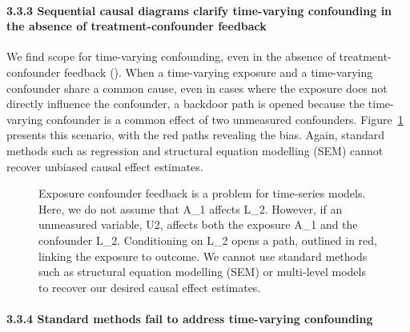 \documentclass[
  singlecolumn]{article}
\let\oldparagraph\paragraph
\renewcommand{\paragraph}[1]{\oldparagraph{#1}\mbox{}}
\begin{document}
\paragraph{3.3.3 Sequential causal diagrams clarify time-varying
confounding in the absence of treatment-confounder
feedback}\label{sequential-causal-diagrams-clarify-time-varying-confounding-in-the-absence-of-treatment-confounder-feedback}

We find scope for time-varying confounding, even in the absence of
treatment-confounder feedback (). When a time-varying exposure and a time-varying
confounder share a common cause, even in cases where the exposure does
not directly influence the confounder, a backdoor path is opened because
the time-varying confounder is a common effect of two unmeasured
confounders. Figure~\ref{fig-dag-time-vary-common-cause-A1-l1} presents
this scenario, with the red paths revealing the bias. Again, standard
methods such as regression and structural equation modelling (SEM)
cannot recover unbiased causal effect estimates.

\begin{figure}


\caption{\label{fig-dag-time-vary-common-cause-A1-l1}Exposure confounder
feedback is a problem for time-series models. Here, we do not assume
that A\_1 affects L\_2. However, if an unmeasured variable, U2, affects
both the exposure A\_1 and the confounder L\_2. Conditioning on L\_2
opens a path, outlined in red, linking the exposure to outcome. We
cannot use standard methods such as structural equation modelling (SEM)
or multi-level models to recover our desired causal effect estimates.}

\end{figure}%

\paragraph{3.3.4 Standard methods fail to address time-varying
confounding}\label{standard-methods-fail-to-address-time-varying-confounding}
\end{document}
